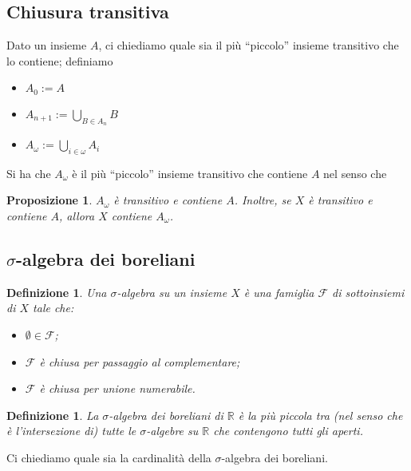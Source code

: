 \documentclass[a4paper,10pt,oneside]{article}
\theoremstyle{plain}
\newtheorem{mydef}[mytheorem]{Definizione}
\newtheorem{myprop}[mytheorem]{Proposizione}
\theoremstyle{definition}
\theoremstyle{remark}
\begin{document}
\subsection{Chiusura transitiva}
Dato un insieme $A$, ci chiediamo quale sia il più ``piccolo'' insieme transitivo che lo contiene; definiamo
\begin{itemize}
 \item $A_0:=A$
 \item $A_{n+1}:=\bigcup_{B\in A_n}B$
 \item $A_\omega:=\bigcup_{i\in\omega}A_i$
\end{itemize}
Si ha che $A_\omega$ è il più ``piccolo'' insieme transitivo che contiene $A$ nel senso che
\begin{myprop}
 $A_\omega$ è transitivo e contiene $A$. Inoltre, se $X$ è transitivo e contiene $A$, allora $X$ contiene $A_\omega$.
\end{myprop}

\subsection{$\sigma$-algebra dei boreliani}

\begin{mydef}
Una $\sigma$-algebra su un insieme $X$ è una famiglia $\mathcal F$ di sottoinsiemi di $X$ tale che:
\begin{itemize}
 \item $\emptyset\in\mathcal F$;
 \item $\mathcal F$ è chiusa per passaggio al complementare;
 \item $\mathcal F$ è chiusa per unione numerabile.
\end{itemize}
\end{mydef}

\begin{mydef}
La $\sigma$-algebra dei boreliani di $\mathbb R$ è la più piccola tra (nel senso che è l'intersezione di) tutte le $\sigma$-algebre su $\mathbb R$ che contengono tutti gli aperti.
\end{mydef}

Ci chiediamo quale sia la cardinalità della $\sigma$-algebra dei boreliani.
\end{document}
